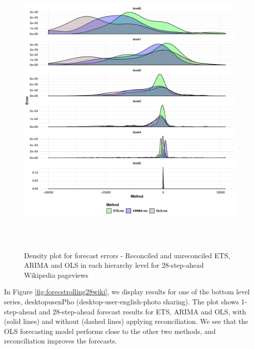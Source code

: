 \documentclass[11pt,a4paper,]{article}
\begin{document}
\begin{figure}

{\centering \includegraphics[width=450px,height=550px]{Paper-Figures/results_Wikipedia/densityplot_28} 

}

\caption{Density plot for forecast errors -  Reconciled and unreconciled ETS, ARIMA and OLS in each hierarchy level for 28-step-ahead Wikipedia pageviews}\label{fig:densityplotwiki}
\end{figure}

In Figure \ref{fig:forecstrolling28wiki}, we display results for one of the bottom level series, desktopusenPho (desktop-user-english-photo sharing). The plot shows 1-step-ahead and 28-step-ahead forecast results for ETS, ARIMA and OLS, with (solid lines) and without (dashed lines) applying reconciliation. We see that the OLS forecasting model performs close to the other two methods, and reconciliation improves the forecasts.
\end{document}
